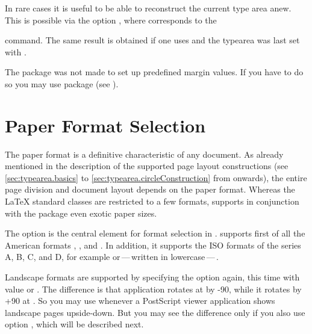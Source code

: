 %
\begin{Declaration}
\end{Declaration}%
In rare cases it is useful to be
able to reconstruct the current type area anew. This is possible via
the option , where
 corresponds to the 
\begin{lstcode}[belowskip=\dp\strutbox]
  \areaset[current]{\textwidth}{\textheight}
\end{lstcode}
command. The same result is obtained if one uses
 and the typearea was last set with
.%
%
%

The  package was not made to set up predefined
margin values. If you have to do so you may use package
 (see
\cite{package:geometry}).


\section{Paper Format Selection}
\label{sec:typearea.paperTypes}%
%

The paper format is a definitive characteristic of any document. As
already mentioned in the description of the supported page layout
constructions (see \autoref{sec:typearea.basics} to
\autoref{sec:typearea.circleConstruction} from
 onwards), the entire page division
and document layout depends on the paper format. Whereas the {\LaTeX}
standard classes are restricted to a few formats, {\KOMAScript}
supports in conjunction with the  package even
exotic paper sizes.


%
%
\begin{Declaration}
\end{Declaration}%
The option  is the
central element for format selection in \KOMAScript.  
supports first of all the American formats ,
, and . In addition, it supports the
ISO formats of the series A, B, C, and D, for example 
or\,---\,written in lowercase\,---\,. 

Landscape formats are supported by specifying the option again, this time with
value  or
. The difference is
that application  rotates at  by
-90\Unit{\textdegree}, while it rotates by +90\Unit{\textdegree} at
. So you may use  whenever a PostScript
viewer application shows landscape pages upside-down. But you may see the
difference only if you also use option , which will be
described next.

